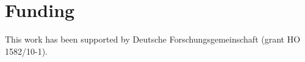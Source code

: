 \documentclass{bioinfo}
\begin{document}
%
%











\section*{Funding}

This work has been supported by Deutsche Forschungsgemeinschaft (grant HO 1582/10-1).\vspace*{-12pt}


%
%
%
%
%
%
%

\end{document}
